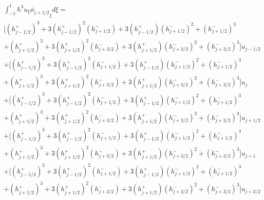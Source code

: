 \documentclass[12pt]{article}
\begin{document}
\begin{multline*}
\int_{-1}^{1}h^3u_{\xi}{\phi_{j+1/2}}_\xi d\xi  = \\
\bigg[\left(h^+_{j - 1/2}\right)^3 + 3 \left(h^+_{j - 1/2}\right)^2 \left(h^-_{j + 1/2}\right)
+ 3 \left(h^+_{j - 1/2}\right) \left(h^-_{j + 1/2}\right)^2 +  \left(h^-_{j + 1/2}\right)^3 \\ + \left(h^+_{j + 1/2} \right)^3 + 3 \left(h^+_{j + 1/2} \right)^2\left(h^-_{j + 3/2}\right) + 3 \left(h^+_{j + 1/2} \right)\left(h^-_{j + 3/2}\right)^2 + \left(h^-_{j + 3/2}\right)^3 \bigg] u_{j - 1/2} \\
+ \bigg[\left(h^+_{j - 1/2}\right)^3 + 3 \left(h^+_{j - 1/2}\right)^2 \left(h^-_{j + 1/2}\right)
+ 3 \left(h^+_{j - 1/2}\right) \left(h^-_{j + 1/2}\right)^2 +  \left(h^-_{j + 1/2}\right)^3 \\ + \left(h^+_{j + 1/2} \right)^3 + 3 \left(h^+_{j + 1/2} \right)^2\left(h^-_{j + 3/2}\right) + 3 \left(h^+_{j + 1/2} \right)\left(h^-_{j + 3/2}\right)^2 + \left(h^-_{j + 3/2}\right)^3 \bigg] u_{j} \\
+
\bigg[\left(h^+_{j - 1/2}\right)^3 + 3 \left(h^+_{j - 1/2}\right)^2 \left(h^-_{j + 1/2}\right)
+ 3 \left(h^+_{j - 1/2}\right) \left(h^-_{j + 1/2}\right)^2 +  \left(h^-_{j + 1/2}\right)^3 \\ + \left(h^+_{j + 1/2} \right)^3 + 3 \left(h^+_{j + 1/2} \right)^2\left(h^-_{j + 3/2}\right) + 3 \left(h^+_{j + 1/2} \right)\left(h^-_{j + 3/2}\right)^2 + \left(h^-_{j + 3/2}\right)^3 \bigg] u_{j + 1/2} \\
+\bigg[\left(h^+_{j - 1/2}\right)^3 + 3 \left(h^+_{j - 1/2}\right)^2 \left(h^-_{j + 1/2}\right)
+ 3 \left(h^+_{j - 1/2}\right) \left(h^-_{j + 1/2}\right)^2 +  \left(h^-_{j + 1/2}\right)^3 \\ + \left(h^+_{j + 1/2} \right)^3 + 3 \left(h^+_{j + 1/2} \right)^2\left(h^-_{j + 3/2}\right) + 3 \left(h^+_{j + 1/2} \right)\left(h^-_{j + 3/2}\right)^2 + \left(h^-_{j + 3/2}\right)^3 \bigg] u_{j +1} \\
+ \bigg[\left(h^+_{j - 1/2}\right)^3 + 3 \left(h^+_{j - 1/2}\right)^2 \left(h^-_{j + 1/2}\right)
+ 3 \left(h^+_{j - 1/2}\right) \left(h^-_{j + 1/2}\right)^2 +  \left(h^-_{j + 1/2}\right)^3 \\ + \left(h^+_{j + 1/2} \right)^3 + 3 \left(h^+_{j + 1/2} \right)^2\left(h^-_{j + 3/2}\right) + 3 \left(h^+_{j + 1/2} \right)\left(h^-_{j + 3/2}\right)^2 + \left(h^-_{j + 3/2}\right)^3 \bigg] u_{j + 3/2} 
\end{multline*}
\end{document}
